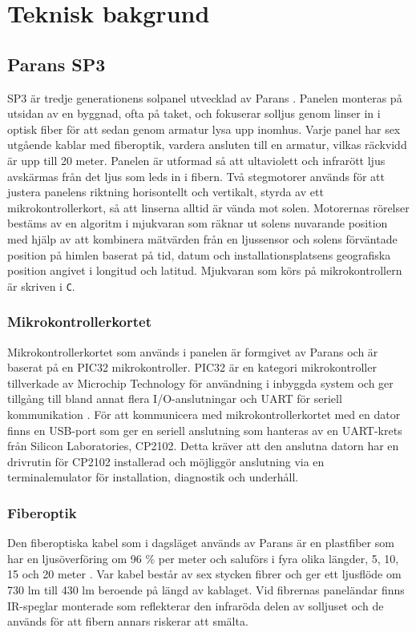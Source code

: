 \section{Teknisk bakgrund} %
\label{sec:teknisk_bakgrund}
    \subsection{Parans SP3} %
    \label{sub:parans_sp3}
        SP3 är tredje generationens solpanel utvecklad av Parans \cite{parans_manual}. Panelen monteras på utsidan av en byggnad, ofta på taket, och fokuserar solljus genom linser in i optisk fiber för att sedan genom armatur lysa upp inomhus. Varje panel har sex utgående kablar med fiberoptik, vardera ansluten till en armatur, vilkas räckvidd är upp till 20 meter. Panelen är utformad så att ultaviolett och infrarött ljus avskärmas från det ljus som leds in i fibern. Två stegmotorer används för att justera panelens riktning horisontellt och vertikalt, styrda av ett mikrokontrollerkort, så att linserna alltid är vända mot solen. Motorernas rörelser bestäms av en algoritm i mjukvaran som räknar ut solens nuvarande position med hjälp av att kombinera mätvärden från en ljussensor och solens förväntade position på himlen baserat på tid, datum och installationsplatsens geografiska position angivet i longitud och latitud. Mjukvaran som körs på mikrokontrollern är skriven i \texttt{C}.

        \subsubsection{Mikrokontrollerkortet} %
        \label{ssub:mikrokontrollerkortet}
            Mikrokontrollerkortet som används i panelen är formgivet av Parans och är baserat på en PIC32 mikrokontroller. PIC32 är en kategori mikrokontroller tillverkade av Microchip Technology för användning i inbyggda system och ger tillgång till bland annat flera I/O-anslutningar och UART för seriell kommunikation \cite[s.~42--44]{PIC32}. För att kommunicera med mikrokontrollerkortet med en dator finns en USB-port som ger en seriell anslutning som hanteras av en UART-krets från Silicon Laboratories, CP2102. Detta kräver att den anslutna datorn har en drivrutin för CP2102 installerad och möjliggör anslutning via en terminalemulator för installation, diagnostik och underhåll.

        \subsubsection{Fiberoptik} %
        \label{ssub:fiberoptik}
            Den fiberoptiska kabel som i dagsläget används av Parans är en plastfiber som har en ljusöverföring om 96 \% per meter och saluförs i fyra olika längder, 5, 10, 15 och 20 meter \cite{parans_spec}. Var kabel består av sex stycken fibrer och ger ett ljusflöde om 730 lm till 430 lm beroende på längd av kablaget. Vid fibrernas paneländar finns IR-speglar monterade som reflekterar den infraröda delen av solljuset och de används för att fibern annars riskerar att smälta.

